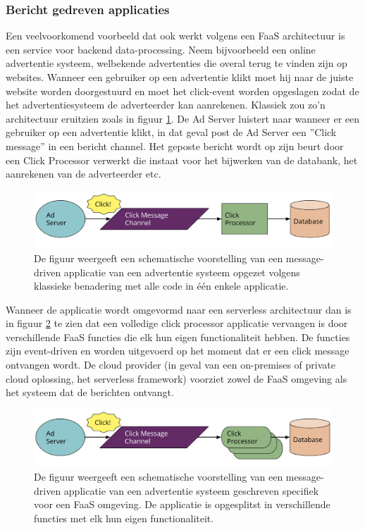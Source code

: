 \subsubsection{Bericht gedreven applicaties}
Een veelvoorkomend voorbeeld dat ook werkt volgens een FaaS architectuur is een service voor backend data-processing. Neem bijvoorbeeld een online advertentie systeem, welbekende advertenties die overal terug te vinden zijn op websites. Wanneer een gebruiker op een advertentie klikt moet hij naar de juiste website worden doorgestuurd en moet het click-event worden opgeslagen zodat de het advertentiesysteem de adverteerder kan aanrekenen.
Klassiek zou zo'n architectuur eruitzien zoals in figuur \ref{fig:klassiek-message-driven}. De Ad Server luistert naar wanneer er een gebruiker op een advertentie klikt, in dat geval post de Ad Server een ''Click message'' in een bericht channel. Het geposte bericht wordt op zijn beurt door een Click Processor verwerkt die instaat voor het bijwerken van de databank, het aanrekenen van de adverteerder etc.
\begin{figure}
    \includegraphics[width=1\textwidth]{img/klassiek_message_driven.png}
    \caption{De figuur weergeeft een schematische voorstelling van een message-driven applicatie van een advertentie systeem opgezet volgens klassieke benadering met alle code in één enkele applicatie. \autocite{Roberts2018}} 
    \label{fig:klassiek-message-driven}  
\end{figure}

Wanneer de applicatie wordt omgevormd naar een serverless architectuur dan is in figuur \ref{fig:faas-message-driven} te zien dat een volledige click processor applicatie vervangen is door verschillende FaaS functies die elk hun eigen functionaliteit hebben. De functies zijn event-driven en worden uitgevoerd op het moment dat er een click message ontvangen wordt. De cloud provider (in geval van een on-premises of private cloud oplossing, het serverless framework)  voorziet zowel de FaaS omgeving als het systeem dat de berichten ontvangt.
\begin{figure}
    \includegraphics[width=1\textwidth]{img/faas_message_driven.png}
    \caption{De figuur weergeeft een schematische voorstelling van een message-driven applicatie van een advertentie systeem geschreven specifiek voor een FaaS omgeving. De applicatie is opgesplitst in verschillende functies met elk hun eigen functionaliteit. \autocite{Roberts2018}} 
    \label{fig:faas-message-driven}  
\end{figure}

